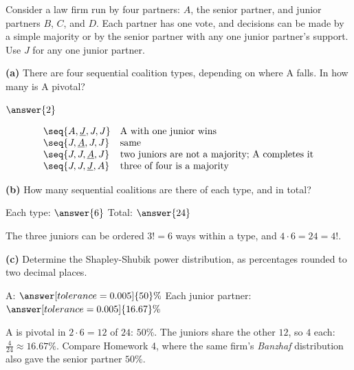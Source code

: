 \documentclass[12pt]{ximera}
\begin{document}
\begin{problem}
Consider a law firm run by four partners: $A$, the senior partner, and junior partners
$B$, $C$, and $D$. Each partner has one vote, and decisions can be made by a simple
majority or by the senior partner with any one junior partner's support. Use $J$ for
any one junior partner.

\begin{prompt}
\textbf{(a)} There are four sequential coalition types, depending on where A falls. In
how many is A pivotal?

$\answer{2}$

\begin{feedback}
\[
\begin{array}{ll}
\seq{A,\underline{J},J,J} & \text{A with one junior wins}\\
\seq{J,\underline{A},J,J} & \text{same}\\
\seq{J,J,\underline{A},J} & \text{two juniors are not a majority; A completes it}\\
\seq{J,J,\underline{J},A} & \text{three of four is a majority}
\end{array}
\]
\end{feedback}
\end{prompt}

\begin{prompt}
\textbf{(b)} How many sequential coalitions are there of each type, and in total?

Each type: $\answer{6}$ \qquad Total: $\answer{24}$

\begin{feedback}
The three juniors can be ordered $3!=6$ ways within a type, and $4\cdot 6=24=4!$.
\end{feedback}
\end{prompt}

\begin{prompt}
\textbf{(c)} Determine the Shapley-Shubik power distribution, as percentages rounded to
two decimal places.

A: $\answer[tolerance=0.005]{50}\%$ \quad Each junior partner:
$\answer[tolerance=0.005]{16.67}\%$

\begin{feedback}
A is pivotal in $2\cdot 6=12$ of $24$: $50\%$. The juniors share the other $12$, so $4$
each: $\frac{4}{24}\approx 16.67\%$. Compare Homework 4, where the same firm's
\emph{Banzhaf} distribution also gave the senior partner $50\%$.
\end{feedback}
\end{prompt}
\end{problem}
\end{document}
